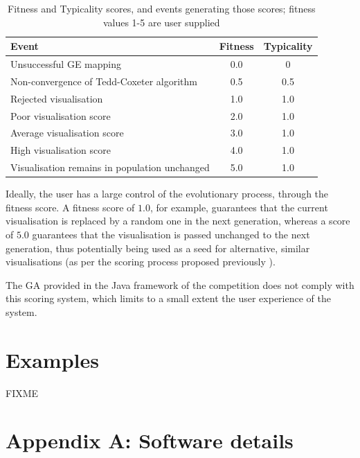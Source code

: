 \documentclass{article}
\begin{document}
\begin{center}
	\begin{table}
	\caption{Fitness and Typicality scores, and events generating those
	scores; fitness values 1-5 are user supplied}
	\begin{tabular}{|l|c|c|}
		\hline
		Event & Fitness & Typicality\\
		\hline
		Unsuccessful GE mapping & 0.0 & 0\\
		\hline
		Non-convergence of Tedd-Coxeter algorithm & 0.5 & 0.5\\
		\hline
		Rejected visualisation & 1.0 & 1.0\\
		\hline
		Poor visualisation score & 2.0 & 1.0\\
		\hline
		Average visualisation score & 3.0 & 1.0\\
		\hline
		High visualisation score & 4.0 & 1.0\\
		\hline
		Visualisation remains in population unchanged & 5.0 & 1.0\\
		\hline
	\end{tabular}
	\label{fittyp}
	\end{table}
\end{center}

Ideally, the user has a large control of the evolutionary process, through the
fitness score. A fitness score of $1.0$, for example, guarantees that the
current visualisation is replaced by a random one in the next generation,
whereas a score of $5.0$ guarantees that the visualisation is passed unchanged
to the next generation, thus potentially being used as a seed for alternative,
similar visualisations (as per the scoring process proposed previously
\cite{nicolau2011a}).

The GA provided in the Java framework of the competition does not comply with
this scoring system, which limits to a small extent the user experience of the
system.

\section{Examples}
FIXME




\section*{Appendix A: Software details}
\end{document}
